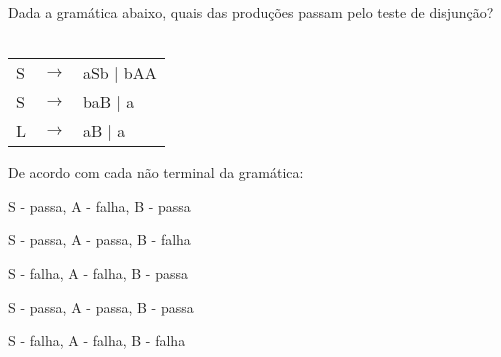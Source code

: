\question[10]
Dada a gramática abaixo, quais das produções passam pelo teste de disjunção?\\
\\
\begin{tabular}{|l c l}
	S & $\rightarrow$ & aSb | bAA \\
    S & $\rightarrow$ & b{aB} | a \\
	L & $\rightarrow$ & aB | a \\
\end{tabular}

De acordo com cada não terminal da gramática:
\begin{choices}
\item S - passa, A - falha, B - passa
\item S - passa, A - passa, B - falha %
\item S - falha, A - falha, B - passa
\item S - passa, A - passa, B - passa
\item S - falha, A - falha, B - falha
\end{choices}
\answerline

